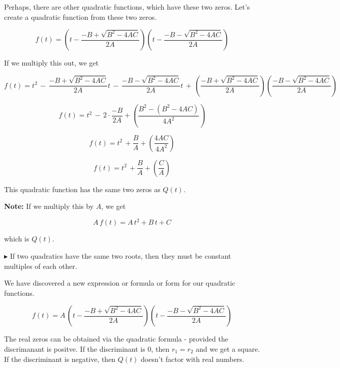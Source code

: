 \documentclass{ximera}
\begin{document}
Perhaps, there are other quadratic functions, which have these two zeros. Let's create a quadratic function from these two zeros.



\[ f(t) =  \left(t - \frac{-B + \sqrt{B^2 - 4 A C}}{2A}\right)   \left(t -  \frac{-B - \sqrt{B^2 - 4 A C}}{2A}\right)   \]


If we multiply this out, we get



\[ f(t) =   t^2 \, - \, \frac{-B + \sqrt{B^2 - 4 A C}}{2A} t \, - \, \frac{-B - \sqrt{B^2 - 4 A C}}{2A}  t \, + \, \left(\frac{-B + \sqrt{B^2 - 4 A C}}{2A}\right) \left(\frac{-B - \sqrt{B^2 - 4 A C}}{2A}\right) \]


\[ f(t) = t^2  \, - \, 2 \cdot \frac{-B}{2A} + \left(    \frac{B^2 - (B^2 - 4 A C)}{4 A^2}     \right)        \]


\[ f(t) = t^2  \, + \frac{B}{A} + \left(    \frac{4 A C}{4 A^2}     \right)        \]

\[ f(t) = t^2  \, +  \frac{B}{A} + \left(    \frac{C}{A}     \right)        \]


This quadratic function has the same two zeros as $Q(t)$.  


\textbf{Note:} If we multiply this by $A$, we get 


\[ A \, f(t) = A \, t^2 + B \, t + C \]

which is $Q(t)$.


$\blacktriangleright$ If two quadratics have the same two roots, then they must be constant multiples of each other.






We have discovered a new expression or formula or form for our quadratic functions.





\[ f(t) = A \, \left(t - \frac{-B + \sqrt{B^2 - 4 A C}}{2A}\right)   \left(t -  \frac{-B - \sqrt{B^2 - 4 A C}}{2A}\right)   \]



















The real zeros can be obtained via the quadratic formula - provided the discrimanant is positve.  If the discriminant is $0$, then $r_1 = r_2$ and we get a square.  If the discriminant is negative, then $Q(t)$ doesn't factor with real numbers.  
\end{document}

